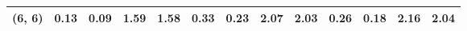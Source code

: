 \begin{tabular}{lrrrrrrrrrrrr}
(6, 6)        &                                               0.13 &                                            0.09 &                            1.59 &                                  1.58 &                                               0.33 &                                            0.23 &                            2.07 &                                  2.03 &                                               0.26 &                                            0.18 &                            2.16 &                                  2.04 \\
\bottomrule
\end{tabular}
